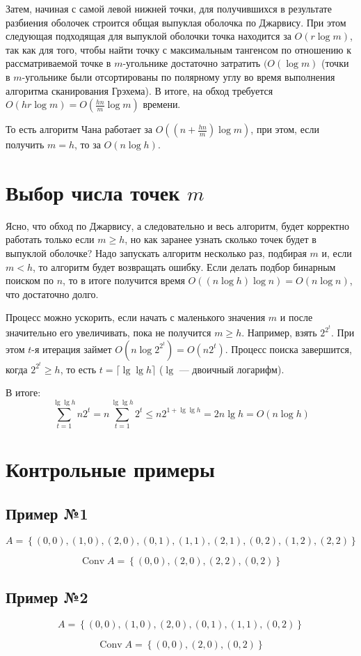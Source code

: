 \documentclass[a4paper,12pt,notitlepage,headsepline,pdftex]{scrreprt}
\begin{document}
  Затем, начиная с самой левой нижней точки, для получившихся в результате
  разбиения оболочек строится общая выпуклая оболочка по Джарвису.
  При этом следующая подходящая для выпуклой оболочки точка находится за
  $O(r\log m)$, так как для того, чтобы найти точку с максимальным тангенсом
  по отношению к рассматриваемой точке в $m$-угольнике достаточно затратить
  $(O(\log m)$ (точки в $m$-угольнике были отсортированы по полярному углу во
  время выполнения алгоритма сканирования Грэхема).
  В итоге, на обход требуется $\displaystyle O\left(hr\log m\right) =
  O\left(\frac{hn}{m} \log m\right)$ времени.

  То есть алгоритм Чана работает за $\displaystyle O\left( \left(n +
  \frac{hn}{m}\right) \log m\right)$, при этом, если получить $m = h$, то за
  $O\left(n\log h\right)$.

\section*{Выбор числа точек $m$}
  Ясно, что обход по Джарвису, а следовательно и весь алгоритм, будет
  корректно работать только если $m \geqslant h$, но как заранее узнать
  сколько точек будет в выпуклой оболочке?
  Надо запускать алгоритм несколько раз, подбирая $m$ и, если $m < h$, то
  алгоритм будет возвращать ошибку.
  Если делать подбор бинарным поиском по $n$, то в итоге получится время
  $\displaystyle O\left( \left(n\log h\right)\log n\right) = O\left(n\log
  n\right)$, что достаточно долго.

  Процесс можно ускорить, если начать с маленького значения $m$ и после
  значительно его увеличивать, пока не получится $m \geqslant h$.
  Например, взять $\displaystyle 2^{2^t}$.
  При этом $t$-я итерация займет $\displaystyle O\left( n\log 2^{2^t} \right)
  = O\left( n 2^t \right)$.
  Процесс поиска завершится, когда $\displaystyle 2^{2^t} \geqslant h$, то
  есть $t = \lceil \lg\lg h \rceil$ ($\lg$ --- двоичный логарифм).

  В итоге:
  \[
    \sum_{t = 1}^{\lg\lg h} n 2^t = n\sum_{t = 1}^{\lg\lg h} 2^t \leqslant n
    2^{1 + \lg\lg h} = 2 n \lg h = O(n\log h)
  \]

\section*{Контрольные примеры}
  \subsection*{Пример №1}
    \[
      A = \left\{
        (0, 0), (1, 0), (2, 0),
        (0, 1), (1, 1), (2, 1),
        (0, 2), (1, 2), (2, 2)
      \right\}
    \]

    \[ \mathop{Conv} A = \left\{
        (0, 0), (2, 0), (2, 2), (0, 2)
       \right\}
    \]
  \subsection*{Пример №2}
    \[
      A = \left\{
        (0, 0), (1, 0), (2, 0),
        (0, 1), (1, 1),
        (0, 2)
      \right\}
    \]

    \[
      \mathop{Conv} A = \left\{
        (0, 0), (2, 0), (0, 2)
      \right\}
    \]
\end{document}
